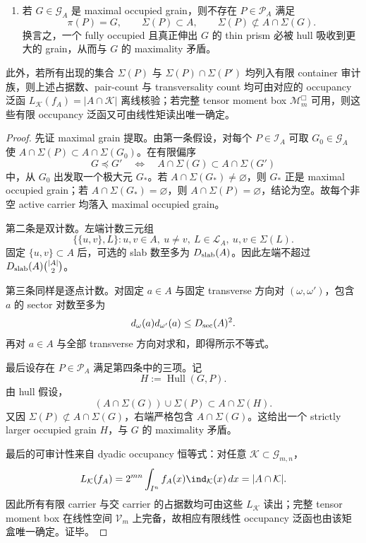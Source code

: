 \begin{proposition}
\begin{enumerate}
\[  |A\cap\Sigma(S)\cap\Sigma(S')|
  \le
  M_{\pitchfork}D_{\rm sec}(A)^2|A|.
  \]
  \item 若 \(G\in\mathscr G_A\) 是 maximal occupied grain，则不存在 \(P\in\mathscr P_A\) 满足
  \[
  \pi(P)=G,\qquad \Sigma(P)\subset A,\qquad
  \Sigma(P)\not\subset A\cap\Sigma(G).
  \]
  换言之，一个 fully occupied 且真正伸出 \(G\) 的 thin prism 必被 hull 吸收到更大的 grain，从而与 \(G\) 的 maximality 矛盾。
\end{enumerate}
此外，若所有出现的集合 \(\Sigma(P)\) 与 \(\Sigma(P)\cap\Sigma(P')\) 均列入有限 container 审计族，则上述占据数、pair-count 与 transversality count 均可由对应的 occupancy 泛函 \(L_{\mathcal K}(f_A)=|A\cap\mathcal K|\) 离线核验；若完整 tensor moment box \(\mathcal M_m^{\Box}\) 可用，则这些有限 occupancy 泛函又可由线性矩读出唯一确定。
\end{proposition}
\begin{proof}
先证 maximal grain 提取。由第一条假设，对每个 \(P\in\mathscr I_A\) 可取 \(G_0\in\mathscr G_A\) 使 \(A\cap\Sigma(P)\subset A\cap\Sigma(G_0)\)。在有限偏序
\[
G\preceq G'\quad\Longleftrightarrow\quad A\cap\Sigma(G)\subset A\cap\Sigma(G')
\]
中，从 \(G_0\) 出发取一个极大元 \(G_\ast\)。若 \(A\cap\Sigma(G_\ast)\ne\varnothing\)，则 \(G_\ast\) 正是 maximal occupied grain；若 \(A\cap\Sigma(G_\ast)=\varnothing\)，则 \(A\cap\Sigma(P)=\varnothing\)，结论为空。故每个非空 active carrier 均落入 maximal occupied grain。

第二条是双计数。左端计数三元组
\[
\{\{u,v\},L\}:u,v\in A,\ u\ne v,\ L\in\mathscr L_A,\ u,v\in\Sigma(L).
\]
固定 \(\{u,v\}\subset A\) 后，可选的 slab 数至多为 \(D_{\rm slab}(A)\)。因此左端不超过 \(D_{\rm slab}(A)\binom{|A|}{2}\)。

第三条同样是逐点计数。对固定 \(a\in A\) 与固定 transverse 方向对 \((\omega,\omega')\)，包含 \(a\) 的 sector 对数至多为
\[
d_\omega(a)d_{\omega'}(a)\le D_{\rm sec}(A)^2.
\]
再对 \(a\in A\) 与全部 transverse 方向对求和，即得所示不等式。

最后设存在 \(P\in\mathscr P_A\) 满足第四条中的三项。记
\[
H:=\operatorname{Hull}(G,P).
\]
由 hull 假设，
\[
(A\cap\Sigma(G))\cup\Sigma(P)\subset A\cap\Sigma(H).
\]
又因 \(\Sigma(P)\not\subset A\cap\Sigma(G)\)，右端严格包含 \(A\cap\Sigma(G)\)。这给出一个 strictly larger occupied grain \(H\)，与 \(G\) 的 maximality 矛盾。

最后的可审计性来自 dyadic occupancy 恒等式：对任意 \(\mathcal K\subset\mathcal G_{m,n}\)，
\[
L_{\mathcal K}(f_A)=2^{mn}\int_{I^n}f_A(x)\ind_{\mathcal K}(x)\,dx=|A\cap\mathcal K|.
\]
因此所有有限 carrier 与交 carrier 的占据数均可由这些 \(L_{\mathcal K}\) 读出；完整 tensor moment box 在线性空间 \(\mathcal V_m\) 上完备，故相应有限线性 occupancy 泛函也由该矩盒唯一确定。证毕。
\end{proof}

